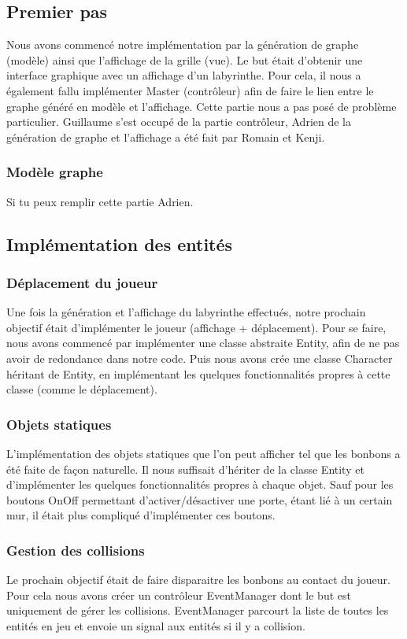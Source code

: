 \documentclass[a4paper]{article}
\begin{document}
\subsection{Premier pas}
Nous avons commencé notre implémentation par la génération de graphe (modèle)
ainsi que l'affichage de la grille (vue). Le but était d'obtenir une interface
graphique avec un affichage d'un labyrinthe. Pour cela, il nous a également
fallu implémenter Master (contrôleur) afin de faire le lien entre le graphe
généré en modèle et l'affichage. Cette partie nous a pas posé de
problème particulier. Guillaume s'est occupé de la partie contrôleur, Adrien
de la génération de graphe et l'affichage a été fait par Romain et Kenji.

\subsubsection{Modèle graphe}

Si tu peux remplir cette partie Adrien.

\subsection{Implémentation des entités}

\subsubsection{Déplacement du joueur}
Une fois la génération et l'affichage du labyrinthe effectués, notre prochain
objectif était d'implémenter le joueur (affichage + déplacement).
Pour se faire, nous avons commencé par implémenter une classe abstraite Entity,
afin de ne pas avoir de redondance dans notre code.
Puis nous avons crée une classe Character héritant de Entity, en implémentant
les quelques fonctionnalités propres à cette classe (comme le déplacement).

\subsubsection{Objets statiques}
L'implémentation des objets statiques que l'on peut afficher tel que les
bonbons a été faite de façon naturelle. Il nous suffisait d'hériter de la
classe Entity et d'implémenter les quelques fonctionnalités propres à chaque
objet. Sauf pour les boutons OnOff permettant d'activer/désactiver une porte,
étant lié à un certain mur, il était plus compliqué d'implémenter ces boutons.

\subsubsection{Gestion des collisions}
Le prochain objectif était de faire disparaitre les bonbons au contact du
joueur. Pour cela nous avons créer un contrôleur EventManager dont le but est
uniquement de gérer les collisions. EventManager parcourt la liste de toutes
les entités en jeu et envoie un signal aux entités si il y a collision.
\end{document}
